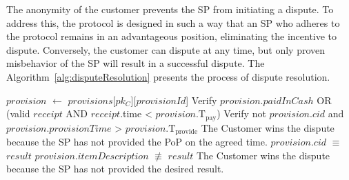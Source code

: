 \documentclass[pdftex,twocolumn,epjc3]{svjour3}
\newcommand{\normal}{\mathrm{n}}
\newcommand{\dispute}{\mathrm{d}}
\newcommand{\abnormal}{\overline{\mathrm{n}}}
\newcommand{\abdispute}{\overline{\mathrm{d}}}
\begin{document}
The anonymity of the customer prevents the SP from initiating a dispute. To address this, the protocol is designed in such a way that an SP who adheres to the protocol remains in an advantageous position, eliminating the incentive to dispute. Conversely, the customer can dispute at any time, but only proven misbehavior of the SP will result in a successful dispute. The Algorithm~\ref{alg:disputeResolution} presents the process of dispute resolution.

\begin{algorithm}
\caption{Algorithm for Dispute Resolution}
\label{alg:disputeResolution}
\begin{algorithmic}[1]
    
    \State $provision$ $\gets$ $provisions$[$pk_C$][$provisionId$]
    \State Verify $provision$.$paidInCash$ OR  (valid $receipt$ AND $receipt$.time < $provision$.$\mathrm{T}_\mathrm{pay}$)
    \State Verify not $provision$.$cid$ and $provision$.$provisionTime$ > $provision$.$\mathrm{T}_\mathrm{provide}$
    \State \Return The Customer wins the dispute because the SP has not provided the PoP on the agreed time.
    \EndIf
        \State $provision$.$cid$ $\equiv$ $result$
        \State $provision$.$itemDescription$ $\not\equiv$ $result$
        \State \Return The Customer wins the dispute because the SP has not provided the desired result.
    \EndIf
\EndFunction
\end{algorithmic}
\end{algorithm}


\end{document}
